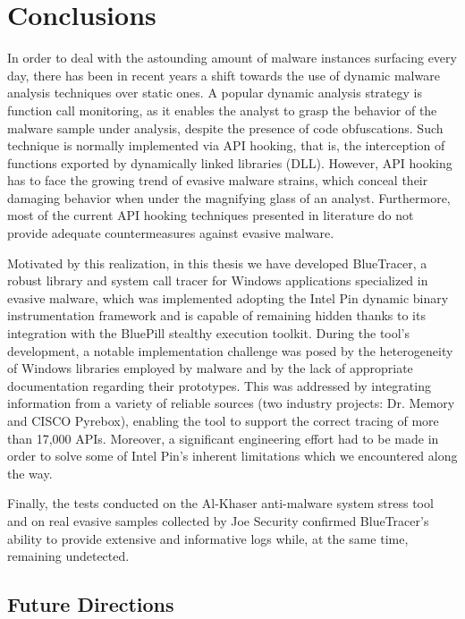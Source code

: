 
\chapter{Conclusions} \label{conclusion}

\vspace{-0.6cm}
In order to deal with the astounding amount of malware instances surfacing every day, there has been in recent years a shift towards the use of dynamic malware analysis techniques over static ones. A popular dynamic analysis strategy is function call monitoring, as it enables the analyst to grasp the behavior of the malware sample under analysis, despite the presence of code obfuscations. Such technique is normally implemented via API hooking, that is, the interception of functions exported by dynamically linked libraries (DLL). However, API hooking has to face the growing trend of evasive malware strains, which conceal their damaging behavior when under the magnifying glass of an analyst. Furthermore, most of the current API hooking techniques presented in literature do not provide adequate countermeasures against evasive malware.

Motivated by this realization, in this thesis we have developed BlueTracer, a robust library and system call tracer for Windows applications specialized in evasive malware, which was implemented adopting the Intel Pin dynamic binary instrumentation framework and is capable of remaining hidden thanks to its integration with the BluePill stealthy execution toolkit. During the tool's development, a notable implementation challenge was posed by the heterogeneity of Windows libraries employed by malware and by the lack of appropriate documentation regarding their prototypes. This was addressed by integrating information from a variety of reliable sources (two industry projects: Dr. Memory and CISCO Pyrebox), enabling the tool to support the correct tracing of more than 17,000 APIs. Moreover, a significant engineering effort had to be made in order to solve some of Intel Pin's inherent limitations which we encountered along the way.

Finally, the tests conducted on the Al-Khaser anti-malware system stress tool and on real evasive samples collected by Joe Security confirmed BlueTracer's ability to provide extensive and informative logs while, at the same time, remaining undetected.    

\section{Future Directions}

